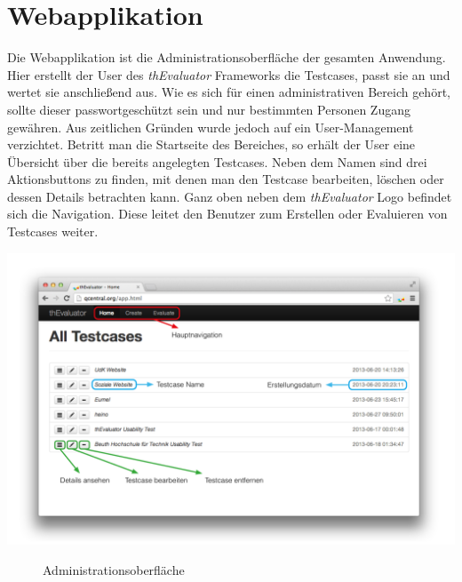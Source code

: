 %
%
%
%

\section{Webapplikation}

Die Webapplikation ist die Administrationsoberfläche der gesamten Anwendung. Hier erstellt der User des \textit{thEvaluator} Frameworks die Testcases, passt sie an und wertet sie anschließend aus. Wie es sich für einen administrativen Bereich gehört, sollte dieser passwortgeschützt sein und nur bestimmten Personen Zugang gewähren. Aus zeitlichen Gründen wurde jedoch auf ein User-Management verzichtet. Betritt man die Startseite des Bereiches, so erhält der User eine Übersicht über die bereits angelegten Testcases. Neben dem Namen sind drei Aktionsbuttons zu finden, mit denen man den Testcase bearbeiten, löschen oder dessen Details betrachten kann. Ganz oben neben dem \textit{thEvaluator} Logo befindet sich die Navigation. Diese leitet den Benutzer zum Erstellen oder Evaluieren von Testcases weiter.

\begin{center}
\includegraphics[scale=0.40]{./images/webappscreen}
\end{center}
\begin{figure}[htb]
   \centering
   \caption{Administrationsoberfläche}
    \label{webappview}
\end{figure}

